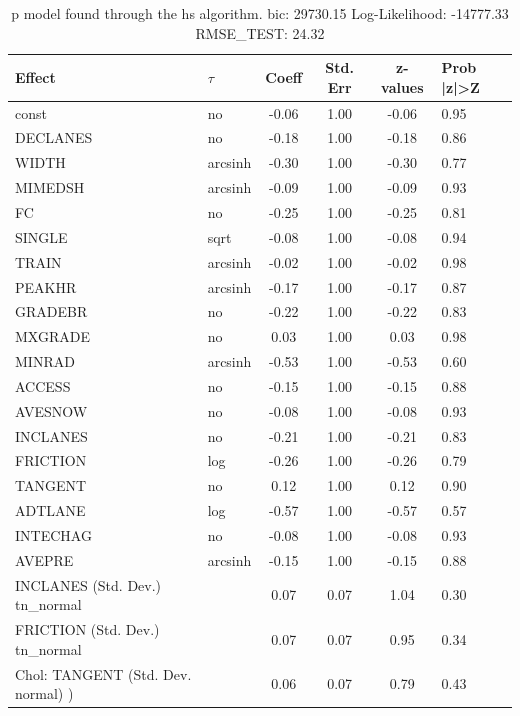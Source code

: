 \begin{table}
	\caption{p model found through the hs algorithm. bic: 29730.15 Log-Likelihood: -14777.33 RMSE_TEST: 24.32}
	\begin{center}
		\begin{tabular}{|l|l|c|c|c|l|}
			\hline
			Effect & $\tau$ & Coeff & Std. Err & z-values & Prob |z|>Z \\
			\hline
			const & no & -0.06 & 1.00 & -0.06 & 0.95 \\
			\hline
			DECLANES & no & -0.18 & 1.00 & -0.18 & 0.86 \\
			\hline
			WIDTH & arcsinh & -0.30 & 1.00 & -0.30 & 0.77 \\
			\hline
			MIMEDSH & arcsinh & -0.09 & 1.00 & -0.09 & 0.93 \\
			\hline
			FC & no & -0.25 & 1.00 & -0.25 & 0.81 \\
			\hline
			SINGLE & sqrt & -0.08 & 1.00 & -0.08 & 0.94 \\
			\hline
			TRAIN & arcsinh & -0.02 & 1.00 & -0.02 & 0.98 \\
			\hline
			PEAKHR & arcsinh & -0.17 & 1.00 & -0.17 & 0.87 \\
			\hline
			GRADEBR & no & -0.22 & 1.00 & -0.22 & 0.83 \\
			\hline
			MXGRADE & no & 0.03 & 1.00 & 0.03 & 0.98 \\
			\hline
			MINRAD & arcsinh & -0.53 & 1.00 & -0.53 & 0.60 \\
			\hline
			ACCESS & no & -0.15 & 1.00 & -0.15 & 0.88 \\
			\hline
			AVESNOW & no & -0.08 & 1.00 & -0.08 & 0.93 \\
			\hline
			INCLANES & no & -0.21 & 1.00 & -0.21 & 0.83 \\
			\hline
			FRICTION & log & -0.26 & 1.00 & -0.26 & 0.79 \\
			\hline
			TANGENT & no & 0.12 & 1.00 & 0.12 & 0.90 \\
			\hline
			ADTLANE & log & -0.57 & 1.00 & -0.57 & 0.57 \\
			\hline
			INTECHAG & no & -0.08 & 1.00 & -0.08 & 0.93 \\
			\hline
			AVEPRE & arcsinh & -0.15 & 1.00 & -0.15 & 0.88 \\
			\hline
			INCLANES (Std. Dev.) tn_normal &  & 0.07 & 0.07 & 1.04 & 0.30 \\
			\hline
			FRICTION (Std. Dev.) tn_normal &  & 0.07 & 0.07 & 0.95 & 0.34 \\
			\hline
			 Chol: TANGENT (Std. Dev. normal) ) &  & 0.06 & 0.07 & 0.79 & 0.43 \\

\end{tabular}
\end{center}
\end{table}
